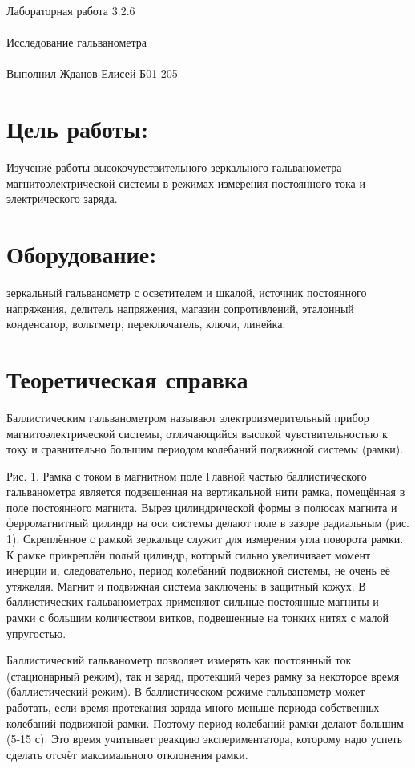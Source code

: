 \documentclass{astroedu-lab}
\begin{document}
\pagestyle{plain}

\begin{problem}{\huge Лабораторная работа 3.2.6\\\\Исследование гальванометра\\\\Выполнил Жданов Елисей Б01-205}

\section{Цель работы:}

Изучение работы высокочувствительного зеркального гальванометра магнитоэлектрической системы в режимах измерения постоянного тока и электрического заряда.

\section{Оборудование:}

зеркальный гальванометр с осветителем и
	шкалой, источник постоянного напряжения, делитель напряжения, магазин сопротивлений, эталонный конденсатор, вольтметр, переключатель, ключи, линейка.
	

\section{Теоретическая справка}

Баллистическим гальванометром называют электроизмерительный прибор магнитоэлектрической системы, отличающийся высокой чувствительностью к току и сравнительно большим периодом колебаний подвижной системы (рамки).

Рис. 1. Рамка с током в магнитном поле
Главной частью баллистического гальванометра является подвешенная на вертикальной нити рамка, помещённая в поле постоянного магнита. Вырез цилиндрической формы в полюсах магнита и ферромагнитный цилиндр на оси системы делают поле в зазоре радиальным (рис. 1). Скреплённое с рамкой зеркальце служит для измерения угла поворота рамки. К рамке прикреплён полый цилиндр, который сильно увеличивает момент инерции и, следовательно, период колебаний подвижной системы, не очень её утяжеляя. Магнит и подвижная система заключены в защитный кожух. В баллистических гальванометрах применяют сильные постоянные магниты и рамки с большим количеством витков, подвешенные на тонких нитях с малой упругостью.

Баллистический гальванометр позволяет измерять как постоянный ток (стационарный режим), так и заряд, протекший через рамку за некоторое время (баллистический режим). В баллистическом режиме гальванометр может работать, если время протекания заряда много меньше периода собственньх колебаний подвижной рамки. Поэтому период колебаний рамки делают большим (5-15 с). Это время учитывает реакцию экспериментатора, которому надо успеть сделать отсчёт максимального отклонения рамки.


\end{problem}
\end{document}
